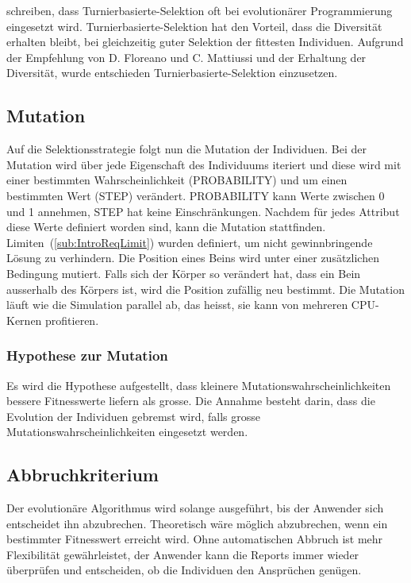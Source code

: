       \citet[S.33]{book:bioInspired} schreiben,
      dass Turnierbasierte-Selektion oft bei evolutionärer Programmierung eingesetzt wird.
      Turnierbasierte-Selektion hat den Vorteil, dass die Diversität erhalten bleibt,
      bei gleichzeitig guter Selektion der fittesten Individuen.
      Aufgrund der Empfehlung von D. Floreano und C. Mattiussi und der Erhaltung der Diversität,
      wurde entschieden Turnierbasierte-Selektion einzusetzen.

    \subsection{Mutation\label{sec:Mutation}}

      Auf die Selektionsstrategie folgt nun die Mutation der Individuen.
      Bei der Mutation wird über jede Eigenschaft des Individuums iteriert und
      diese wird mit einer bestimmten Wahrscheinlichkeit (PROBABILITY) und um einen bestimmten Wert (STEP) verändert.
      PROBABILITY kann Werte zwischen 0 und 1 annehmen, STEP hat keine Einschränkungen.
      Nachdem für jedes Attribut diese Werte definiert worden sind, kann die Mutation stattfinden.
      Limiten~(\vref{sub:IntroReqLimit}) wurden definiert, um nicht gewinnbringende Lösung zu verhindern.
      Die Position eines Beins wird unter einer zusätzlichen Bedingung mutiert. Falls sich der Körper so verändert hat,
      dass ein Bein ausserhalb des Körpers ist, wird die Position zufällig neu bestimmt.
      Die Mutation läuft wie die Simulation parallel ab, das heisst, sie kann von mehreren CPU-Kernen profitieren.

      \subsubsection{Hypothese zur Mutation\label{subsub:hypoMut}}

        Es wird die Hypothese aufgestellt,
        dass kleinere Mutationswahrscheinlichkeiten bessere Fitnesswerte liefern als grosse.
        Die Annahme besteht darin, dass die Evolution der Individuen gebremst wird,
        falls grosse Mutationswahrscheinlichkeiten eingesetzt werden.

    \subsection{Abbruchkriterium}

      Der evolutionäre Algorithmus wird solange ausgeführt, bis der Anwender sich entscheidet ihn abzubrechen.
      Theoretisch wäre möglich abzubrechen, wenn ein bestimmter Fitnesswert erreicht wird.
      Ohne automatischen Abbruch ist mehr Flexibilität gewährleistet,
      der Anwender kann die Reports immer wieder überprüfen und entscheiden,
      ob die Individuen den Ansprüchen genügen.


